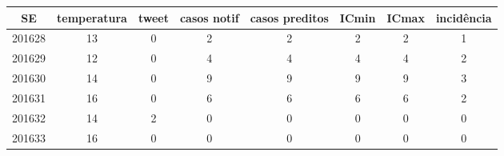 \begin{tabular}{c|ccccccc}
  \hline
SE & temperatura & tweet & casos notif & casos preditos & ICmin & ICmax & incidência \\ 
  \hline
201628 & 13 & 0 & 2 & 2 & 2 & 2 & 1 \\ 
  201629 & 12 & 0 & 4 & 4 & 4 & 4 & 2 \\ 
  201630 & 14 & 0 & 9 & 9 & 9 & 9 & 3 \\ 
  201631 & 16 & 0 & 6 & 6 & 6 & 6 & 2 \\ 
  201632 & 14 & 2 & 0 & 0 & 0 & 0 & 0 \\ 
  201633 & 16 & 0 & 0 & 0 & 0 & 0 & 0 \\ 
   \hline
\end{tabular}
